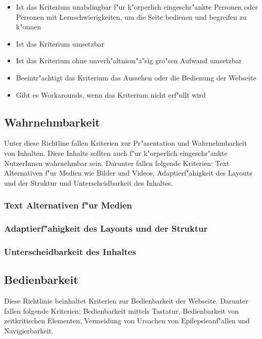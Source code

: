 \documentclass[a4paper,bibtotoc,oneside]{scrbook}
\begin{document}
\begin{itemize}
\item Ist das Kriterium unabdingbar f"ur k"orperlich eingeschr"ankte Personen oder Personen mit Lernschwierigkeiten, um die Seite bedienen und begreifen zu k"onnen
\item Ist das Kriterium umsetzbar
\item Ist das Kriterium ohne unverh"altnism"a"sig gro"sen Aufwand umsetzbar
\item Beeintr"achtigt das Kriterium das Aussehen oder die Bedienung der Webseite
\item Gibt es Workarounds, wenn das Kriterium nicht erf"ullt wird
\end{itemize}


\subsection{Wahrnehmbarkeit}
Unter diese Richtline fallen Kriterien zur Pr"asentation und Wahrnehmbarkeit von Inhalten. Diese Inhalte sollten auch f"ur k"orperlich eingeschr"ankte NutzerInnen wahrnehmbar sein. Darunter fallen folgende Kriterien: Text Alternativen f"ur Medien wie Bilder und Videos, Adaptierf"ahigkeit des Layouts und der Struktur und Unterscheidbarkeit des Inhaltes. \cite[Abschnitt 1]{wcag2} 

\subsubsection{Text Alternativen f"ur Medien}
\cite[Abschnitt 1.1 und 1.2]{wcag2}

\subsubsection{Adaptierf"ahigkeit des Layouts und der Struktur}
\cite[Abschnitt 1.3]{wcag2}

\subsubsection{Unterscheidbarkeit des Inhaltes}
\cite[Abschnitt 1.4]{wcag2}



\subsection{Bedienbarkeit}
Diese Richtlinie beinhaltet Kriterien zur Bedienbarkeit der Webseite. Darunter fallen folgende Kriterien: Bedienbarkeit mittels Tastatur, Bedienbarkeit von zeitkritischen Elementen, Vermeidung von Ursachen von Epilepsieanf"allen und Navigierbarkeit. \cite[Abschnitt 2]{wcag2}
\end{document}

